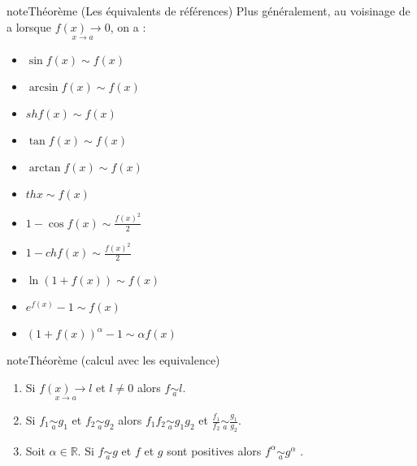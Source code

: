 \documentclass[letterpaper,10pt,french]{jupyterBook}
\begin{document}
\begin{sphinxadmonition}{note}{Théorème (Les équivalents de références)}
\sphinxAtStartPar
Plus généralement, au voisinage de a lorsque \(\underset{x\to a}{f(x) \to 0}\), on a :
\begin{itemize}
\item {} 
\sphinxAtStartPar
\(\sin f(x) \sim f(x)\)

\item {} 
\sphinxAtStartPar
\(\arcsin f(x) \sim f(x)\)

\item {} 
\sphinxAtStartPar
\(sh f(x) \sim f(x)\)

\item {} 
\sphinxAtStartPar
\(\tan f(x) \sim f(x)\)

\item {} 
\sphinxAtStartPar
\(\arctan f(x) \sim f(x)\)

\item {} 
\sphinxAtStartPar
\(th x \sim f(x)\)

\item {} 
\sphinxAtStartPar
\(1 − \cos f(x) \sim \frac{f(x)^2}{2}\)

\item {} 
\sphinxAtStartPar
\(1 − ch f(x) \sim \frac{f(x)^2}{2}\)

\item {} 
\sphinxAtStartPar
\(\ln(1 + f(x)) \sim f(x)\)

\item {} 
\sphinxAtStartPar
\(e^{f(x)} − 1 \sim f(x)\)

\item {} 
\sphinxAtStartPar
\((1 + f(x))^α − 1 \sim αf(x)\)

\end{itemize}
\end{sphinxadmonition}

\begin{sphinxadmonition}{note}{Théorème (calcul avec les equivalence)}
\begin{enumerate}
%
\item {} 
\sphinxAtStartPar
Si \(\underset{x\to a}{f(x) \to l}\) et \(l\neq 0\) alors \(f\underset{a}{\sim}l\).

\item {} 
\sphinxAtStartPar
Si \(f_1 \underset{a}{\sim}g_1\) et  \(f_2 \underset{a}{\sim}g_2\) alors  \(f_1f_2 \underset{a}{\sim}g_1g_2\) et  \(\frac{f_1}{f_2} \underset{a}{\sim}\frac{g_1}{g_2}\).

\item {} 
\sphinxAtStartPar
Soit \(\alpha \in \mathbb{R}\). Si \(f \underset{a}{\sim}g\) et \(f\) et \(g\) sont positives alors \(f^\alpha \underset{a}{\sim}g^\alpha\) .

\end{enumerate}
\end{sphinxadmonition}
\end{document}
